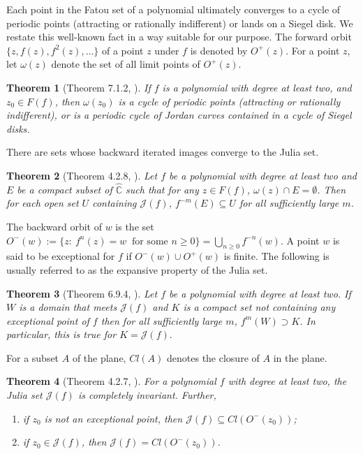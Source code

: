 \documentclass[12pt,a4paper]{article}
\theoremstyle{plain}
\newtheorem{theorem}{Theorem}[section]
\numberwithin{equation}{section}
\begin{document}
Each point in the Fatou set of a polynomial ultimately converges to a cycle of periodic points (attracting or rationally indifferent) or lands on a Siegel disk. We restate this well-known fact in a way suitable for our purpose. The forward orbit $\{z, f(z), f^2(z), \ldots\}$ of a point $z$ under $f$  is denoted by $O^+(z)$. 
For a point $z$, let $\omega(z)$ denote the set of all limit points of $O^{+}(z)$. 
\begin{theorem}[Theorem 7.1.2, \cite{beardon} ]
	If \(f\) is a polynomial with degree at least two, and \(z_0\in F(f)\), then $\omega(z_0)$ is a cycle of  periodic points (attracting or rationally indifferent), or is a periodic cycle of  Jordan curves contained in a cycle of Siegel disks.
	\label{Thm3}
\end{theorem}
 There are sets whose backward iterated images converge to the Julia set.
\begin{theorem}[Theorem 4.2.8, \cite{beardon}]
	  Let \(f\) be a polynomial with degree at least two and \(E\) be a compact subset of \(\mathbb{\widehat{C}}\) such that for any \(z \in F(f)\), \(\omega(z) \cap E =\emptyset\). Then for each open set \(U\) containing \(\mathcal{J}(f)\), \(f^{-m}(E)\subseteq U\)  for all sufficiently large \(m\).
	  \label{Thm1}
\end{theorem}
The backward orbit of $w$ is the set $O^-(w):=\{z: ~f^n(z) = w~\text{ for some } n\geq 0\} = \bigcup_{n\geq 0}f^{-n}(w)$. A point $w$ is said to be exceptional for $f$ if $O^{-}(w) \cup O^{+}(w)$  is finite. The following is usually referred to as the expansive property of the Julia set.
\begin{theorem}[Theorem 6.9.4, \cite{beardon}]
    Let \(f\) be a polynomial with degree at least two.
  If \(W\) is a domain that meets \(\mathcal{J}(f)\) and \(K\) is a compact set not containing any exceptional point of \(f\) then for all sufficiently large \(m\), \(f^{m}(W)\supset K\). In particular, this is true for $K=\mathcal{J}(f).$
   	\label{Juliaset-expanding}
 \end{theorem}
For a subset $A$ of the plane, $Cl(A)$ denotes the closure of $A$ in the plane.
    \begin{theorem}[Theorem 4.2.7, \cite{beardon}]
        For a polynomial \(f\) with  degree at least two, the Julia set $\mathcal{J}(f)$ is completely invariant. Further,
        \begin{enumerate}[label=(\roman{*})]
            \item if \(z_0\) is not an exceptional point, then \(\mathcal{J}(f) \subseteq Cl(O^-(z_0))\);
            \item if \(z_0 \in \mathcal{J}(f)\), then \(\mathcal{J}(f) = Cl(O^-(z_0))\).
        \end{enumerate}
        \label{Juliaset}
    \end{theorem}
\end{document}
